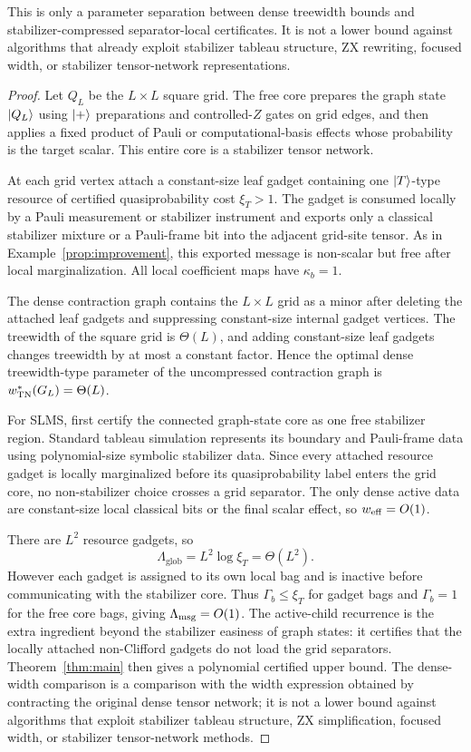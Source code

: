 This is only a parameter separation between dense treewidth bounds and stabilizer-compressed separator-local certificates. It is not a lower bound against algorithms that already exploit stabilizer tableau structure, ZX rewriting, focused width, or stabilizer tensor-network representations.

\begin{proof}
Let \(Q_L\) be the \(L\times L\) square grid. The free core prepares the graph state \(\left|Q_L\right\rangle\) using \(\left|+\right\rangle\) preparations and controlled-\(Z\) gates on grid edges, and then applies a fixed product of Pauli or computational-basis effects whose probability is the target scalar. This entire core is a stabilizer tensor network.

At each grid vertex attach a constant-size leaf gadget containing one \(\left|T\right\rangle\)-type resource of certified quasiprobability cost \(\xi_T>1\). The gadget is consumed locally by a Pauli measurement or stabilizer instrument and exports only a classical stabilizer mixture or a Pauli-frame bit into the adjacent grid-site tensor. As in Example~\ref{prop:improvement}, this exported message is non-scalar but free after local marginalization. All local coefficient maps have \(\kappa_b=1\).

The dense contraction graph contains the \(L\times L\) grid as a minor after deleting the attached leaf gadgets and suppressing constant-size internal gadget vertices. The treewidth of the square grid is \(\Theta(L)\), and adding constant-size leaf gadgets changes treewidth by at most a constant factor. Hence the optimal dense treewidth-type parameter of the uncompressed contraction graph is \(w_{\mathrm{TN}}^\ast(G_L)=\Theta(L)\).

For SLMS, first certify the connected graph-state core as one free stabilizer region. Standard tableau simulation represents its boundary and Pauli-frame data using polynomial-size symbolic stabilizer data. Since every attached resource gadget is locally marginalized before its quasiprobability label enters the grid core, no non-stabilizer choice crosses a grid separator. The only dense active data are constant-size local classical bits or the final scalar effect, so \(w_{\mathrm{eff}}=O(1)\).

There are \(L^2\) resource gadgets, so
\[
\Lambda_{\mathrm{glob}}=L^2\log\xi_T=\Theta(L^2).
\]
However each gadget is assigned to its own local bag and is inactive before communicating with the stabilizer core. Thus \(\Gamma_b\le \xi_T\) for gadget bags and \(\Gamma_b=1\) for the free core bags, giving \(\Lambda_{\mathrm{msg}}=O(1)\). The active-child recurrence is the extra ingredient beyond the stabilizer easiness of graph states: it certifies that the locally attached non-Clifford gadgets do not load the grid separators. Theorem~\ref{thm:main} then gives a polynomial certified upper bound. The dense-width comparison is a comparison with the width expression obtained by contracting the original dense tensor network; it is not a lower bound against algorithms that exploit stabilizer tableau structure, ZX simplification, focused width, or stabilizer tensor-network methods.
\end{proof}

